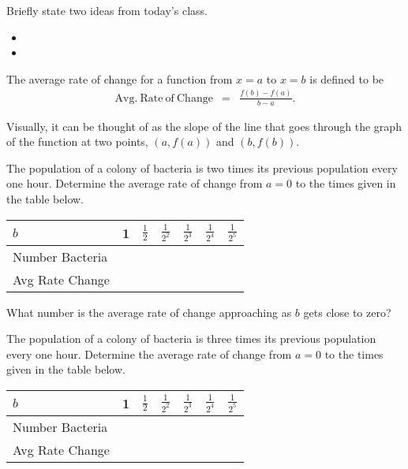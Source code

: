 \postClass

\begin{problem}
\item Briefly state two ideas from today's class.
  \begin{itemize}
  \item 
  \item 
  \end{itemize}
\item The average rate of change for a function from $x=a$ to $x=b$ is
  defined to be 
  \begin{eqnarray*}
    \mathrm{Avg.~Rate~of~Change} & = & \frac{f(b)-f(a)}{b-a}.
  \end{eqnarray*}
  \scalebox{0.65}{}

  Visually, it can be thought of as the slope of the line that goes
  through the graph of the function at two points, $(a,f(a))$ and
  $(b,f(b))$.

  \begin{subproblem}
  \item The population of a colony of bacteria is two times its
    previous population every one hour. Determine the average rate of
    change from $a=0$ to the times
    given in the table below. \\
    \begin{tabular}{p{4em}|p{3em}|p{3em}|p{3em}|p{3em}|p{3em}|p{3em}}
      $b$ & 1 & $\frac{1}{2}$ & $\frac{1}{2^2}$ & $\frac{1}{2^3}$ &
      $\frac{1}{2^4}$ & $\frac{1}{2^5}$ \\ \hline
      Number Bacteria &&&&&  \\ [12pt] \hline 
      Avg Rate Change &&&&& 
    \end{tabular}

    What number is the average rate of change approaching as $b$ gets
    close to zero?

  \item The population of a colony of bacteria is three times its
    previous population every one hour. Determine the average rate of
    change from $a=0$ to the times
    given in the table below. \\
    \begin{tabular}{p{4em}|p{3em}|p{3em}|p{3em}|p{3em}|p{3em}|p{3em}}
      $b$ & 1 & $\frac{1}{2}$ & $\frac{1}{2^2}$ & $\frac{1}{2^3}$ &
      $\frac{1}{2^4}$ & $\frac{1}{2^5}$ \\ \hline
      Number Bacteria &&&&&  \\ [12pt] \hline
      Avg Rate Change &&&&& 
    \end{tabular}


\end{subproblem}
\end{problem}

